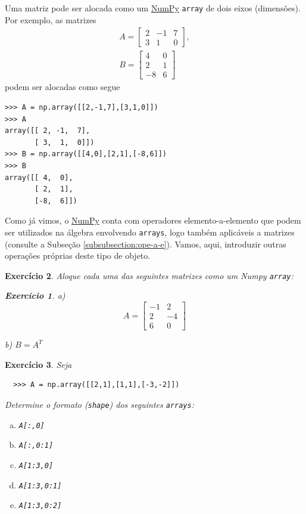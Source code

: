 \documentclass[12pt]{article}
\newtheorem{exr}{Exercício}[section]
\begin{document}
Uma matriz pode ser alocada como um \href{https://numpy.org/}{NumPy} \lstinline+array+ de dois eixos (dimensões). Por exemplo, as matrizes
\begin{gather}
  A =
  \begin{bmatrix}
    2 & -1 & 7\\
    3 & 1 & 0
  \end{bmatrix},\\
  B =
  \begin{bmatrix}
    4 & 0\\
    2 & 1\\
   -8 & 6
  \end{bmatrix}
\end{gather}
podem ser alocadas como segue
\begin{lstlisting}
>>> A = np.array([[2,-1,7],[3,1,0]])
>>> A
array([[ 2, -1,  7],
       [ 3,  1,  0]])
>>> B = np.array([[4,0],[2,1],[-8,6]])
>>> B
array([[ 4,  0],
       [ 2,  1],
       [-8,  6]])
\end{lstlisting}


Como já vimos, o \href{https://numpy.org/}{NumPy} conta com operadores elemento-a-elemento que podem ser utilizados na álgebra envolvendo \lstinline+arrays+, logo também aplicáveis a matrizes (consulte a Subseção \ref{subsubsection:ope-a-e}). Vamos, aqui, introduzir outras operações próprias deste tipo de objeto.

\begin{exr}
  Aloque cada uma das seguintes matrizes como um Numpy \lstinline+array+:
  \begin{exr}
  \item[a)]
    \begin{equation}
      A =
      \begin{bmatrix}
        -1 & 2\\
        2 & -4\\
        6 & 0
      \end{bmatrix}
    \end{equation}
  \item[b)] $B = A^T$ 
  \end{exr}
\end{exr}

\begin{exr}
  Seja
  \begin{lstlisting}
  >>> A = np.array([[2,1],[1,1],[-3,-2]])
  \end{lstlisting}
  Determine o formato (\lstinline+shape+) dos seguintes \lstinline+arrays+:
  \begin{enumerate}[a)]
  \item \lstinline+A[:,0]+
  \item \lstinline+A[:,0:1]+
  \item \lstinline+A[1:3,0]+
  \item \lstinline+A[1:3,0:1]+
  \item \lstinline+A[1:3,0:2]+
  \end{enumerate}
\end{exr}
\end{document}
